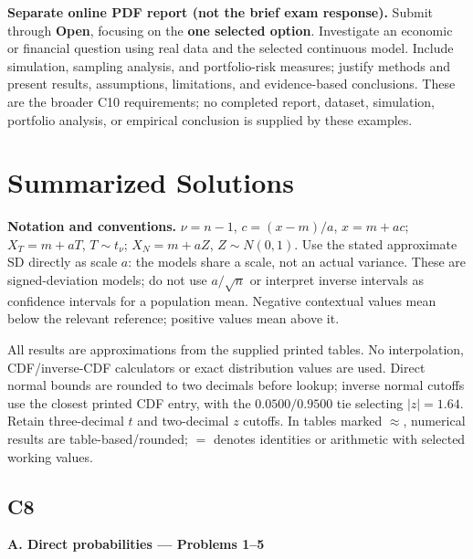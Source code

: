 {\textbf{Separate online PDF report (not the brief exam response).}
Submit through \textbf{Open}, focusing on the \textbf{one selected option}.
Investigate an economic or financial question using real data and the selected continuous model.
Include simulation, sampling analysis, and portfolio-risk measures; justify methods and present results,
assumptions, limitations, and evidence-based conclusions. These are the broader C10 requirements;
no completed report, dataset, simulation, portfolio analysis, or empirical conclusion is supplied by these examples.

\secInicio[][sec:q17]
}

\newpage
\section{Summarized Solutions}
\begingroup
\small
\setlength{\parskip}{5pt}
\setlength{\tabcolsep}{5pt}
\renewcommand{\arraystretch}{1.22}
\textbf{Notation and conventions.}
$\nu=n-1$, $c=(x-m)/a$, $x=m+ac$;
$X_T=m+aT$, $T\sim t_\nu$; $X_N=m+aZ$, $Z\sim N(0,1)$.
Use the stated approximate SD directly as scale $a$: the models share a scale,
not an actual variance. These are signed-deviation models; do not use
$a/\sqrt n$ or interpret inverse intervals as confidence intervals for a population mean.
Negative contextual values mean below the relevant reference; positive values mean above it.

All results are approximations from the supplied printed tables. No interpolation,
CDF/inverse-CDF calculators or exact distribution values are used.
Direct normal bounds are rounded to two decimals before lookup; inverse normal
cutoffs use the closest printed CDF entry, with the $0.0500/0.9500$ tie selecting
$|z|=1.64$. Retain three-decimal $t$ and two-decimal $z$ cutoffs.
In tables marked $\approx$, numerical results are table-based/rounded;
$=$ denotes identities or arithmetic with selected working values.

\subsection*{C8}
\textbf{A. Direct probabilities --- Problems 1--5}

